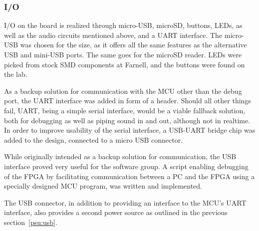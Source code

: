 
\subsubsection{I/O}

I/O on the board is realized through micro-USB, microSD, buttons, LEDs, as
well as the audio circuits mentioned above, and a UART interface. The micro-USB was chosen for the
size, as it offers all the same features as the alternative USB and mini-USB ports. The same goes for the
microSD reader. LEDs were picked from stock SMD components at Farnell, and the
buttons were found on the lab.

As a backup solution for communication with the MCU other than the debug port,
the UART interface was added in form of a header. Should all other things fail,
UART, being a simple serial interface, would be a viable fallback solution, both
for debugging as well as piping sound in and out, although not in realtime. In
order to improve usability of the serial interface, a USB-UART bridge chip was
added to the design, connected to a micro USB connector.

While originally intended as a backup solution for communication, the USB
interface proved very useful for the software group. A script enabling debugging
of the FPGA by facilitating communication between a PC and the FPGA using a
specially designed MCU program, was written and implemented. 

The USB connector, in addition to providing an interface to the MCU's UART
interface, also provides a second power source as outlined in
the previous section~\ref{psu:usb}.
